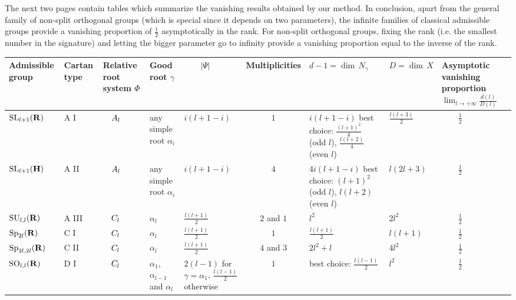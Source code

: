 \documentclass[11pt]{article}
\theoremstyle{definition}
\numberwithin{equation}{section}
\numberwithin{figure}{section}
\numberwithin{table}{section}
\DeclareMathOperator{\SL}{SL}
\DeclareMathOperator{\SU}{SU}
\DeclareMathOperator{\SO}{SO}
\DeclareMathOperator{\Sp}{Sp}
\begin{document}
The next two pages contain tables which summarize the vanishing results obtained by our method. In conclusion, apart from the general family of non-split orthogonal groups (which is special since it depends on two parameters), the infinite families of classical admissible groups provide a vanishing proportion of $\frac{1}{2}$ asymptotically in the rank. For non-split orthogonal groups, fixing the rank (i.e. the smallest number in the signature) and letting the bigger parameter go to infinity provide a vanishing proportion equal to the inverse of the rank.

\begin{landscape}\footnotesize
\renewcommand{\arraystretch}{1.32}
\begin{tabular}{| M{2cm} || M{1.2cm} | M{1.7cm} | M{1.3cm} | M{2cm} | c | M{2.7cm} | M{2.1cm} | M{2.8cm} |}
\hline

Admissible group & Cartan type & Relative root system $\Phi$ & Good root $\gamma$ & $\qquad |\Psi |$ & Multiplicities & $d-1 = {\dim} \, N_\gamma$ & $D = {\dim} \, X$ & Asymptotic vanishing proportion $\displaystyle \lim_{l \to +\infty} \scriptstyle \frac{d(l)}{D(l)}$ \tabularnewline
\hline

${\SL}_{l+1}({\bf R})$ & A I & $\quad{\rm A}_l$ & any simple root $\alpha_i$ & $i(l+1-i)$ & $1$ & $i(l+1-i)$ best choice: $\frac{(l+1)^2}{4}$ (odd $l$), $\frac{l(l+2)}{4}$ (even $l$) & $\displaystyle \frac{l(l+3)}{2}$ & $\qquad\frac{1}{2}$ \tabularnewline
\hline

${\SL}_{l+1}({\bf H})$ & A II & $\quad{\rm A}_l$ & any simple root $\alpha_i$ & $i(l+1-i)$ & $4$ & $4i(l+1-i)$ best choice: $\scriptstyle (l+1)^2$ (odd $l$), $\scriptstyle l(l+2)$ (even $l$) & $\displaystyle l(2l+3)$ & $\qquad\frac{1}{2}$ \tabularnewline
\hline

${\SU}_{l,l}({\bf R})$ & A III & $\quad{\rm C}_l$ & $\alpha_l$ & $\frac{l(l+1)}{2}$ & $2$ and $1$ & $l^2$ & $2l^2$ & $\qquad\frac{1}{2}$ \tabularnewline
\hline

${\Sp}_{2l}({\bf R})$ & C I & $\quad{\rm C}_l$ & $\alpha_l$ & $ \frac{l(l+1)}{2}$ & $1$ & $\frac{l(l+1)}{2}$ & $l(l+1)$ & $\qquad\frac{1}{2}$ \tabularnewline
\hline

${\Sp}_{2l,2l}({\bf R})$ & C II & $\quad{\rm C}_l$ & $\alpha_l$ & $\frac{l(l+1)}{2}$ & $4$ and $3$ & $2l^2+l$ & $4l^2$ & $\qquad\frac{1}{2}$ \tabularnewline
\hline

${\SO}_{l,l}({\bf R})$ & D I & $\quad{\rm C}_l$ & $\alpha_1$, $\alpha_{l-1}$ and $\alpha_l$ & $2(l-1)$ for $\gamma = \alpha_1$, $\frac{l(l-1)}{2}$ otherwise & $1$ & best choice: $\frac{l(l-1)}{2}$ & $l^2$ & $\qquad\frac{1}{2}$ \tabularnewline
\hline


\end{tabular}
\end{landscape}
\end{document}
